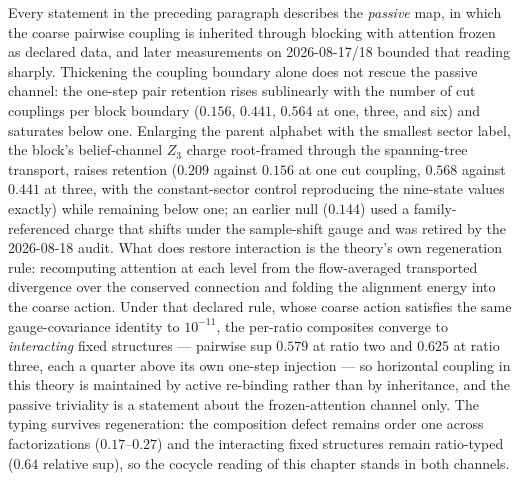 Every statement in the preceding paragraph describes the \emph{passive} map,
in which the coarse pairwise coupling is inherited through blocking with
attention frozen as declared data, and later measurements on 2026-08-17/18
bounded that reading sharply.  Thickening the coupling boundary alone does not
rescue the passive channel: the one-step pair retention rises sublinearly with
the number of cut couplings per block boundary ($0.156$, $0.441$, $0.564$ at
one, three, and six) and saturates below one.  Enlarging the parent alphabet
with the smallest sector label, the block's belief-channel $Z_3$ charge
root-framed through the spanning-tree transport, raises retention ($0.209$
against $0.156$ at one cut coupling, $0.568$ against $0.441$ at three, with
the constant-sector control reproducing the nine-state values exactly) while
remaining below one; an earlier null ($0.144$) used a family-referenced
charge that shifts under the sample-shift gauge and was retired by the
2026-08-18 audit.  What
does restore interaction is the theory's own regeneration rule: recomputing
attention at each level from the flow-averaged transported divergence over
the conserved connection and folding the alignment energy into the coarse
action.  Under that declared rule, whose coarse action satisfies the same
gauge-covariance identity to $10^{-11}$, the per-ratio composites converge to
\emph{interacting} fixed structures — pairwise sup $0.579$ at ratio two and
$0.625$ at ratio three, each a quarter above its own one-step injection — so
horizontal coupling in this theory is maintained by active re-binding rather
than by inheritance, and the passive triviality is a statement about the
frozen-attention channel only.  The typing survives regeneration: the
composition defect remains order one across factorizations ($0.17$--$0.27$)
and the interacting fixed structures remain ratio-typed ($0.64$ relative
sup), so the cocycle reading of this chapter stands in both channels.

